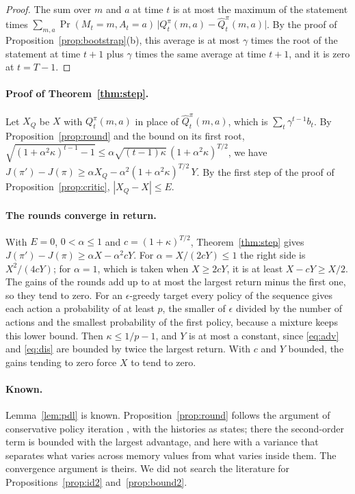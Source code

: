 \documentclass{article}
\theoremstyle{definition}
\begin{document}
\begin{proof}
The sum over $m$ and $a$ at time $t$ is at most the maximum of the statement times $\sum_{m,a}\Pr(M_t=m,A_t=a)\,\big|Q^\pi_t(m,a)-\hat Q^\pi_t(m,a)\big|$. By the proof of Proposition~\ref{prop:bootstrap}(b), this average is at most $\gamma$ times the root of the statement at time $t+1$ plus $\gamma$ times the same average at time $t+1$, and it is zero at $t=T-1$.
\end{proof}

\paragraph{Proof of Theorem~\ref{thm:step}.} Let $X_Q$ be $X$ with $Q^\pi_t(m,a)$ in place of $\hat Q^\pi_t(m,a)$, which is $\sum_t\gamma^{t-1}b_t$. By Proposition~\ref{prop:round} and the bound on its first root, $\sqrt{(1+\alpha^2\kappa)^{t-1}-1}\le\alpha\sqrt{(t-1)\kappa}\,(1+\alpha^2\kappa)^{T/2}$, we have $J(\pi')-J(\pi)\ge\alpha X_Q-\alpha^2(1+\alpha^2\kappa)^{T/2}\,Y$. By the first step of the proof of Proposition~\ref{prop:critic}, $|X_Q-X|\le E$.

\paragraph{The rounds converge in return.} With $E=0$, $0<\alpha\le1$ and $c=(1+\kappa)^{T/2}$, Theorem~\ref{thm:step} gives $J(\pi')-J(\pi)\ge\alpha X-\alpha^2cY$. For $\alpha=X/(2cY)\le1$ the right side is $X^2/(4cY)$; for $\alpha=1$, which is taken when $X\ge2cY$, it is at least $X-cY\ge X/2$. The gains of the rounds add up to at most the largest return minus the first one, so they tend to zero. For an $\epsilon$-greedy target every policy of the sequence gives each action a probability of at least $p$, the smaller of $\epsilon$ divided by the number of actions and the smallest probability of the first policy, because a mixture keeps this lower bound. Then $\kappa\le1/p-1$, and $Y$ is at most a constant, since \eqref{eq:adv} and \eqref{eq:dis} are bounded by twice the largest return. With $c$ and $Y$ bounded, the gains tending to zero force $X$ to tend to zero.

\paragraph{Known.} Lemma~\ref{lem:pdl} is known. Proposition~\ref{prop:round} follows the argument of conservative policy iteration \citep{kakade2002cpi}, with the histories as states; there the second-order term is bounded with the largest advantage, and here with a variance that separates what varies across memory values from what varies inside them. The convergence argument is theirs. We did not search the literature for Propositions~\ref{prop:id2} and~\ref{prop:bound2}.
\end{document}
